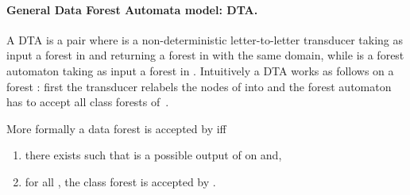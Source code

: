 \documentclass{CSML}
\newcommand\wdad{\textup{DTA}\xspace}
\begin{document}
\paragraph{General Data Forest Automata model: \wdad.}  
A \wdad is a pair  where  is a non-deterministic
letter-to-letter transducer taking as input a forest in  and
returning a forest in  with the same domain, while  is a
forest automaton taking as input a forest in . Intuitively a
\wdad works as follows on a forest : first the
transducer  relabels the nodes of  into  and the forest
automaton  has to accept all class forests of~. 

More formally a data forest  
is accepted by  iff
\begin{enumerate}
\item there exists  such that
 is a possible output of  on  and,
\item for all , 
      the class forest  is accepted by .
\end{enumerate}
\end{document}
